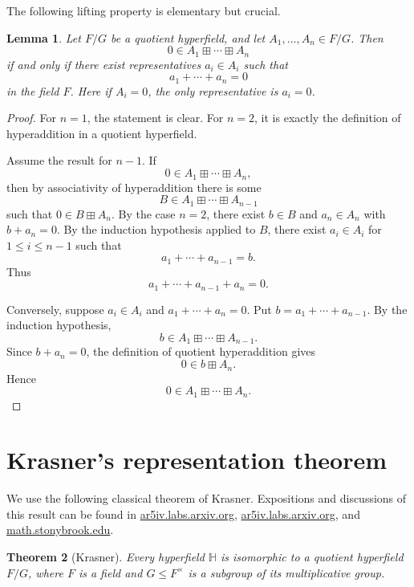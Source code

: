 \documentclass{article}
\newtheorem{theorem}{Theorem}
\newtheorem{lemma}[theorem]{Lemma}
\begin{document}
The following lifting property is elementary but crucial.

\begin{lemma}\label{lem:lift-zero-sum}
Let \(F/G\) be a quotient hyperfield, and let \(A_1,\dots,A_n\in F/G\). Then
\[
0\in A_1\boxplus\cdots\boxplus A_n
\]
if and only if there exist representatives \(a_i\in A_i\) such that
\[
a_1+\cdots+a_n=0
\]
in the field \(F\). Here if \(A_i=0\), the only representative is \(a_i=0\).
\end{lemma}

\begin{proof}
For \(n=1\), the statement is clear. For \(n=2\), it is exactly the definition of hyperaddition in a quotient hyperfield.

Assume the result for \(n-1\). If
\[
0\in A_1\boxplus\cdots\boxplus A_n,
\]
then by associativity of hyperaddition there is some
\[
B\in A_1\boxplus\cdots\boxplus A_{n-1}
\]
such that \(0\in B\boxplus A_n\). By the case \(n=2\), there exist \(b\in B\) and \(a_n\in A_n\) with \(b+a_n=0\). By the induction hypothesis applied to \(B\), there exist \(a_i\in A_i\) for \(1\le i\le n-1\) such that
\[
a_1+\cdots+a_{n-1}=b.
\]
Thus
\[
a_1+\cdots+a_{n-1}+a_n=0.
\]

Conversely, suppose \(a_i\in A_i\) and \(a_1+\cdots+a_n=0\). Put \(b=a_1+\cdots+a_{n-1}\). By the induction hypothesis,
\[
b\in A_1\boxplus\cdots\boxplus A_{n-1}.
\]
Since \(b+a_n=0\), the definition of quotient hyperaddition gives
\[
0\in b\boxplus A_n.
\]
Hence
\[
0\in A_1\boxplus\cdots\boxplus A_n.
\]
\end{proof}

\section{Krasner's representation theorem}

We use the following classical theorem of Krasner. Expositions and discussions of this result can be found in
\href{https://ar5iv.labs.arxiv.org/html/1006.3034}{ar5iv.labs.arxiv.org},
\href{https://ar5iv.labs.arxiv.org/html/2307.09400}{ar5iv.labs.arxiv.org},
and
\href{https://www.math.stonybrook.edu/\%7Eoleg/VersoTeX/Show/Hyperfields/hf.html}{math.stonybrook.edu}.

\begin{theorem}[Krasner]\label{thm:krasner}
Every hyperfield \(\mathbb H\) is isomorphic to a quotient hyperfield \(F/G\), where \(F\) is a field and \(G\le F^\times\) is a subgroup of its multiplicative group.
\end{theorem}
\end{document}
